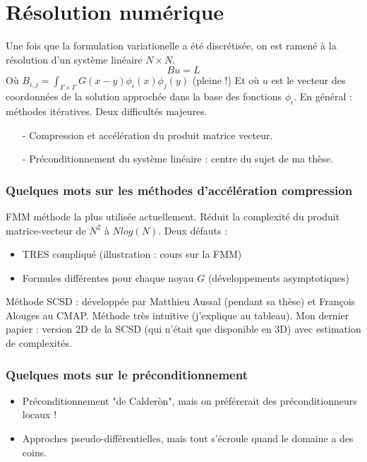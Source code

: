 \documentclass[11pt]{beamer}
\begin{document}
	\section{Résolution numérique}
	\setcounter{subsection}{1}
	\begin{frame}
		Une fois que la formulation variationelle a été discrétisée, on est ramené à la résolution d'un système linéaire $N \times N$.  
		\[Bu = L\]
		Où $B_{i,j} = \int_{\Gamma\times\Gamma} G(x-y) \phi_i(x) \phi_j(y)$ (pleine !)
		Et où $u$ est le vecteur des coordonnées de la solution approchée dans la base des fonctions $\phi_i$. 
		En général : méthodes itératives. Deux difficultés majeures. 
		\begin{itemize}
			\item[-] Compression et accélération du produit matrice vecteur.
			\item[-] Préconditionnement du système linéaire : centre du sujet de ma thèse. 
		\end{itemize}
	\end{frame}
	\begin{frame}
		\frametitle{Quelques mots sur les méthodes d'accélération compression}
		FMM méthode la plus utilisée actuellement. Réduit la complexité du produit matrice-vecteur de $N^2$ à $Nlog(N)$. 
		Deux défauts : 
		\begin{itemize}
			\item TRES compliqué (illustration : cours sur la FMM)
			\item Formules différentes pour chaque noyau $G$ (développements asymptotiques)
		\end{itemize}
		Méthode SCSD : développée par Matthieu Aussal (pendant sa thèse) et François Alouges au CMAP. Méthode très intuitive (j'explique au tableau). 
		Mon dernier papier : version 2D de la SCSD (qui n'était que disponible en 3D) avec estimation de complexités. 
	\end{frame}
	\begin{frame}
		\frametitle{Quelques mots sur le préconditionnement}
		\begin{itemize}
			\item Préconditionnement "de Calderòn", mais on préférerait des préconditionneurs locaux !
			\item Approches pseudo-différentielles, mais tout s'écroule quand le domaine a des coins. 
		\end{itemize}
	\end{frame}
\end{document}
